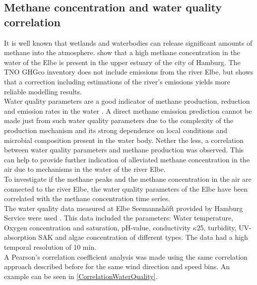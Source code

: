 \subsection{Methane concentration and water quality correlation}
It is well known that wetlands and waterbodies can release significant amounts of methane into the atmosphere. \cite{Matousu.2019} show that a high methane concentration in the water of the Elbe is present in the upper estuary of the city of Hamburg. The TNO GHGco inventory does not include emissions from the river Elbe, but \cite{Forstmaier.2023} shows that a correction including estimations of the river's emissions yields more reliable modelling results.\\
Water quality parameters are a good indicator of methane production, reduction and emission rates in the water \cite{Wu.2007}.  A direct methane emission prediction cannot be made just from such water quality parameters due to the complexity of the production mechanism and its strong dependence on local conditions and microbial composition present in the water body. Nether the less, a correlation between water quality parameters and methane production was observed. This can help to provide further indication of alleviated methane concentration in the air due to mechanisms in the water of the river Elbe. \\
To investigate if the methane peaks and the methane concentration in the air are connected to the river Elbe, the water quality parameters of the Elbe have been correlated with the methane concentration time series.\\
The water quality data measured at Elbe Seemannshöft provided by Hamburg Service were used \cite{IHUW.20230501}. This data included the parameters: Water temperature, Oxygen concentration and saturation, pH-value, conductivity $\kappa$25, turbidity, UV-absorption SAK and algae concentration of different types. The data had a high temporal resolution of 10 min. \\
A Pearson's correlation coefficient analysis was made using the same correlation approach described before for the same wind direction and speed bins. An example can be seen in \cref{CorrelationWaterQuality}.

